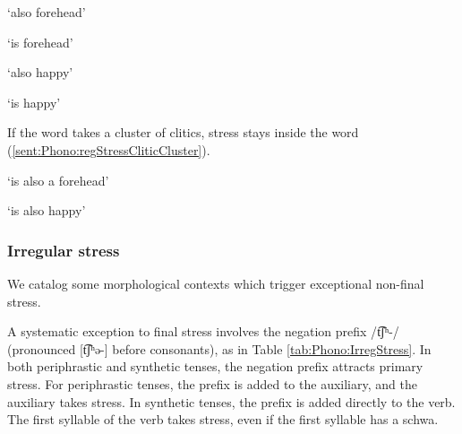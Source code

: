 \begin{exe}
	\ex \label{sent:Phono:regStressClitic}
	\begin{xlist}
		
		\ex {}
		
		\makebox[3cm][l]{}`also forehead'
		
		
		\makebox[3cm][l]{}`is forehead'
		\ex {}
		
		\makebox[3cm][l]{}`also happy'	
		
		
		\makebox[3cm][l]{}`is happy'
		
		
	\end{xlist}
\end{exe}

If the word takes a cluster of clitics, stress stays inside the word (\ref{sent:Phono:regStressCliticCluster}). 

\begin{exe}
	\ex \label{sent:Phono:regStressCliticCluster}\begin{xlist}
		\ex {}\armenian{ճակատ էլ	ա}
		
		\makebox[3cm][l]{}`is also a  forehead'
		\ex {}\armenian{ուրախ էլ	ա}
		
		\makebox[3cm][l]{}`is also happy'
	\end{xlist}
\end{exe}


\subsubsection{Irregular  stress}\label{section:phono:suprasegmental:stress:irreg}
We catalog some morphological contexts which trigger exceptional non-final stress. 


A systematic exception to final stress involves the negation prefix /{t͡ʃʰ-}/ (pronounced [{t͡ʃʰə-}] before consonants), as in Table \ref{tab:Phono:IrregStress}. In both periphrastic and synthetic tenses, the negation prefix attracts primary stress. For periphrastic tenses, the prefix is added to the auxiliary, and the auxiliary takes stress. In synthetic tenses, the prefix is added directly to the verb. The first syllable of the verb takes stress, even if the first syllable has a schwa. 


